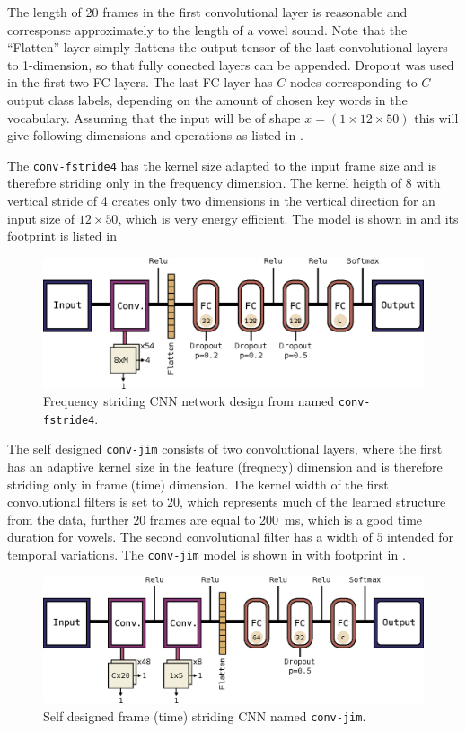 The length of 20 frames in the first convolutional layer is reasonable and corresponse approximately to the length of a vowel sound.
Note that the \enquote{Flatten} layer simply flattens the output tensor of the last convolutional layers to 1-dimension, so that fully conected layers can be appended.
Dropout was used in the first two FC layers.
The last FC layer has $C$ nodes corresponding to $C$ output class labels, depending on the amount of chosen key words in the vocabulary.
Assuming that the input will be of shape $x = (1 \times 12 \times 50)$ this will give following dimensions and operations as listed in .


The \texttt{conv-fstride4} has the kernel size adapted to the input frame size and is therefore striding only in the frequency dimension.
The kernel heigth of 8 with vertical stride of 4 creates only two dimensions in the vertical direction for an input size of $12 \times 50$, which is very energy efficient. 
The model is shown in  and its footprint is listed in 
\begin{figure}[!ht]
  \centering
    \includegraphics[height=0.2\textwidth]{./4_nn/figs/nn_arch_cnn_fstride.eps}
  \caption{Frequency striding CNN network design from \cite{Sainath2015} named \texttt{conv-fstride4}.}
  \label{fig:nn_arch_cnn_fstride}
\end{figure}
\FloatBarrier
\noindent


The self designed \texttt{conv-jim} consists of two convolutional layers, where the first has an adaptive kernel size in the feature (freqnecy) dimension and is therefore striding only in frame (time) dimension.
The kernel width of the first convolutional filters is set to $20$, which represents much of the learned structure from the data, further $20$ frames are equal to \SI{200}{\milli\second}, which is a good time duration for vowels.
The second convolutional filter has a width of $5$ intended for temporal variations.
The \texttt{conv-jim} model is shown in  with footprint in .
\begin{figure}[!ht]
  \centering
    \includegraphics[height=0.2\textwidth]{./4_nn/figs/nn_arch_cnn_conv-jim.eps}
  \caption{Self designed frame (time) striding CNN named \texttt{conv-jim}.}
  \label{fig:nn_arch_cnn_conv-jim}
\end{figure}
\FloatBarrier
\noindent



